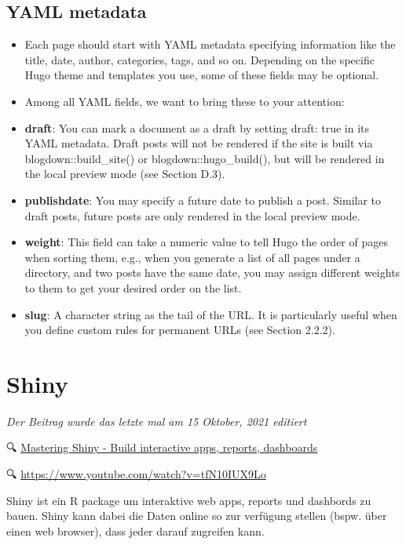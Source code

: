 \documentclass[
]{article}
\providecommand{\tightlist}{%
  \setlength{\itemsep}{0pt}\setlength{\parskip}{0pt}}
\begin{document}
\hypertarget{yaml-metadata}{%
\subsection{YAML metadata}\label{yaml-metadata}}

\begin{itemize}
\tightlist
\item
  Each page should start with YAML metadata specifying information
  like the title, date, author, categories, tags, and so on. Depending
  on the specific Hugo theme and templates you use, some of these
  fields may be optional.
\item
  Among all YAML fields, we want to bring these to your attention:
\item
  \textbf{draft}: You can mark a document as a draft by setting draft: true
  in its YAML metadata. Draft posts will not be rendered if the site
  is built via blogdown::build\_site() or blogdown::hugo\_build(), but
  will be rendered in the local preview mode (see Section D.3).
\item
  \textbf{publishdate}: You may specify a future date to publish a post.
  Similar to draft posts, future posts are only rendered in the local
  preview mode.
\item
  \textbf{weight}: This field can take a numeric value to tell Hugo the
  order of pages when sorting them, e.g., when you generate a list of
  all pages under a directory, and two posts have the same date, you
  may assign different weights to them to get your desired order on
  the list.
\item
  \textbf{slug}: A character string as the tail of the URL. It is
  particularly useful when you define custom rules for permanent URLs
  (see Section 2.2.2).
\end{itemize}

\hypertarget{shiny}{%
\section{Shiny}\label{shiny}}

\emph{Der Beitrag wurde das letzte mal am 15 Oktober, 2021 editiert}

🔍 \href{https://mastering-shiny.org/index.html}{Mastering Shiny - Build interactive apps, reports, dashboards}

🔍 \url{https://www.youtube.com/watch?v=tfN10IUX9Lo}

Shiny ist ein R package um interaktive web apps, reports und dashbords zu bauen. Shiny kann dabei die Daten online so zur verfügung stellen (bspw. über einen web browser), dass jeder darauf zugreifen kann.
\end{document}
